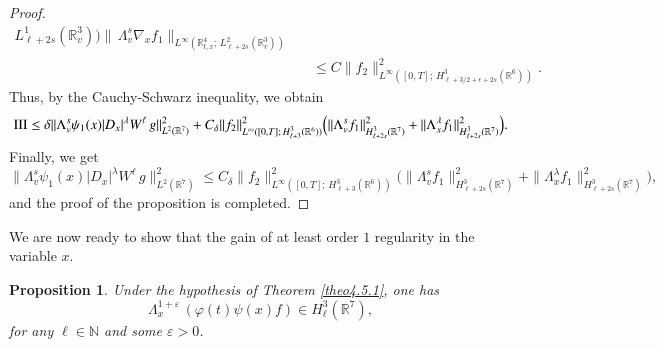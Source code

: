 \documentclass{amsart}[12pt, article]
\newtheorem{prop}[theo]{Proposition}
\begin{document}
\begin{proof}
\begin{eqnarray*}
{L^1_{\ell+2s}({{{\mathbb R}}}^3_v))}\|\,\Lambda_v^{s} \nabla_{x}
f_1\|_{L^\infty({{{\mathbb R}}}^4_{t, x};\, L^2_{\ell+2s}({{{\mathbb R}}}^3_v))}
\\
&&\leq C\|f_2\|^2_{L^\infty([0, T];\,
H^3_{\ell+3/2+\epsilon+2s}({{{\mathbb R}}}^6))}.
\end{eqnarray*}
Thus, by the Cauchy-Schwarz inequality, we obtain
\begin{align*}
{\rm III}\leq\delta\|\Lambda^{s}_v \psi_1(x)|D_{ x}|^{\lambda}
W^\ell\,g\|^2_{L^2({{{\mathbb R}}}^7)}+ C_\delta \|f_2\|^2_{L^\infty([0,
T];\,H^{3}_{\ell+3}({{{\mathbb R}}}^6))}\Big(\|\Lambda_v^s f_1\|^2_{H^{3}_{\ell
+2s}({{{\mathbb R}}}^7)}+\|\Lambda_x^\lambda f_1\|^2_{H^{3}_{\ell
+2s}({{{\mathbb R}}}^7)}\Big).
\end{align*}
Finally, we get
$$
\|\Lambda^{s}_v \psi_1(x)|D_{x}|^{\lambda}
W^\ell\,g\|^2_{L^2({{{\mathbb R}}}^7)}\leq C_\delta \|f_2\|^2_{L^\infty([0,
T];\,H^{3}_{\ell+3}({{{\mathbb R}}}^6))}\Big(\|\Lambda_v^s f_1\|^2_{H^{3}_{\ell
+2s}({{{\mathbb R}}}^7)}+\|\Lambda_x^\lambda f_1\|^2_{H^{3}_{\ell
+2s}({{{\mathbb R}}}^7)}\Big),
$$
and the proof of the proposition is completed.
\end{proof}

\smallbreak We are now ready to show that the gain of at least order $1$
 regularity
in the variable $x$.
\begin{prop}\label{prop5.4.3}
Under the hypothesis of Theorem \ref{theo4.5.1}, one has
\begin{equation}\label{5.5.1}
\Lambda^{1+\varepsilon}_{x}\, (\varphi(t)\psi(x) f)\in H^3_\ell
({{{\mathbb R}}}^7),
\end{equation}
for any $\ell  \in{{\mathbb N}}$ and some $\varepsilon>0$.
\end{prop}
\end{document}
